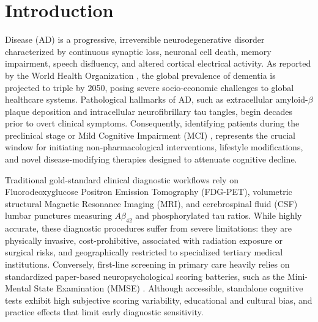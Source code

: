 \documentclass[conference]{IEEEtran}
\begin{document}
\section{Introduction}
 Disease (AD) is a progressive, irreversible neurodegenerative disorder characterized by continuous synaptic loss, neuronal cell death, memory impairment, speech disfluency, and altered cortical electrical activity. As reported by the World Health Organization \cite{who2023}, the global prevalence of dementia is projected to triple by 2050, posing severe socio-economic challenges to global healthcare systems. Pathological hallmarks of AD, such as extracellular amyloid-$\beta$ plaque deposition and intracellular neurofibrillary tau tangles, begin decades prior to overt clinical symptoms. Consequently, identifying patients during the preclinical stage or Mild Cognitive Impairment (MCI) \cite{jack2018}, \cite{sperling2011} represents the crucial window for initiating non-pharmacological interventions, lifestyle modifications, and novel disease-modifying therapies designed to attenuate cognitive decline.

Traditional gold-standard clinical diagnostic workflows rely on Fluorodeoxyglucose Positron Emission Tomography (FDG-PET), volumetric structural Magnetic Resonance Imaging (MRI), and cerebrospinal fluid (CSF) lumbar punctures measuring $A\beta_{42}$ and phosphorylated tau ratios. While highly accurate, these diagnostic procedures suffer from severe limitations: they are physically invasive, cost-prohibitive, associated with radiation exposure or surgical risks, and geographically restricted to specialized tertiary medical institutions. Conversely, first-line screening in primary care heavily relies on standardized paper-based neuropsychological scoring batteries, such as the Mini-Mental State Examination (MMSE) \cite{folstein1975}. Although accessible, standalone cognitive tests exhibit high subjective scoring variability, educational and cultural bias, and practice effects that limit early diagnostic sensitivity.
\end{document}
